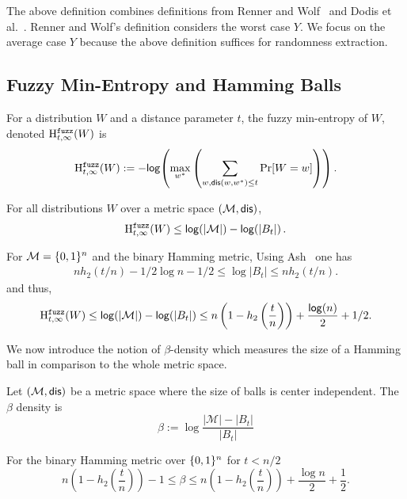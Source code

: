 The above definition combines definitions from Renner and Wolf~\cite{renner2005simple} and Dodis et al.~\cite{dodis2008fuzzy}.  Renner and Wolf's definition considers the worst case $Y$.  We focus on the average case $Y$ because the above definition suffices for randomness extraction.






\subsection{Fuzzy Min-Entropy and Hamming Balls}
\begin{definition}

For a distribution $W$ and a distance parameter $t$, the fuzzy min-entropy of $W$, denoted $\mathrm{H}^{\mathtt{fuzz}}_{t,\infty}(W)$ is 
\[
\mathrm{H}^{\mathtt{fuzz}}_{t,\infty}(W):= -\mathsf{log}\!\left( \max_{w^*} \left(\sum_{w, \mathsf{dis}(w, w^*)\le t} \Pr[W=w] \right)\right).
\]
\end{definition}

\begin{proposition} \label{prop:max fuzz ent}
For all distributions $W$ over a metric space $(\mathcal{M}, \mathsf{dis})$, 
\[\mathrm{H}^{\mathtt{fuzz}}_{t,\infty}(W) \le \mathsf{log}\!\left(|\mathcal{M}|\right) - \mathsf{log}\!\left(|B_t|\right).
\]
\end{proposition}
\noindent
For $\mathcal{M} = \{0, 1\}^n$ and the binary Hamming metric,
Using Ash~\cite[Lemma 4.7.2, Equation 4.7.5, p. 115]{ash2012information} one has
\begin{align} nh_2(t/n)  -1/2\log{n} - 1/2 \le \log{|B_t|} \le  nh_2(t/n)\label{eq:size of balls}.\end{align}
and thus, 
\[
\mathrm{H}^{\mathtt{fuzz}}_{t,\infty}(W) \le \mathsf{log}\!\left(|\mathcal{M}|\right) - \mathsf{log}\!\left(|B_t|\right)\le n\left(1-h_2\left(\frac{t}{n}\right)\right)+ \frac{\mathsf{log}\!\left(n\right)}{2} +1/2.
\]

\noindent
We now introduce the notion of $\beta$-density which measures the size of a Hamming ball in comparison to the whole metric space.
\begin{definition}
Let $(\mathcal{M}, \mathsf{dis})$ be a metric space where the size of balls is center independent.  The $\beta$ density is
\[
\beta := \log{\frac{|\mathcal{M}|- |B_t|}{|B_t|}} 
\]
\label{def:b density}
\end{definition}
\begin{claim} 
For the binary Hamming metric over $\{0, 1\}^n$ for $t<n/2$
\[
n\left(1-h_2\left(\frac{t}{n}\right)\right)-1 \le \beta \le n\left(1-h_2\left(\frac{t}{n}\right)\right)+\frac{\log{n}}{2}+\frac{1}{2}.
\]

\end{claim}

